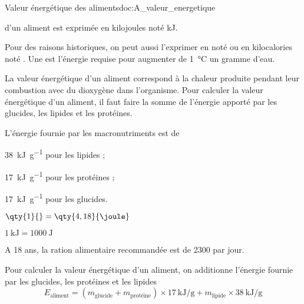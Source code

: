 \newpage
\vspace*{-36pt}
\begin{doc}{Valeur énergétique des aliments}{doc:A_valeur_energetique}
  \begin{importants}  
     d'un aliment est exprimée en kilojoules noté \unit{\kilo\joule}.
  \end{importants}
  Pour des raisons historiques, on peut aussi l'exprimer en  noté \unit{\cal} ou en kilocalories noté \unit{\kcal}.
  Une  est l'énergie requise pour augmenter de \qty{1}{\degreeCelsius} un gramme d'eau.

  La valeur énergétique d'un aliment correspond à la chaleur produite pendant leur combustion avec du dioxygène dans l'organisme.
  Pour calculer la valeur énergétique d'un aliment, il faut faire la somme de l'énergie apporté par les glucides, les lipides et les protéines.
  
  \begin{importants}
    L'énergie fournie par les macronutriments est de
    \begin{listePoints}[2]
      \item \qty{38}{\kilo\joule\per\g} pour les lipides ;
      \item \qty{17}{\kilo\joule\per\g} pour les protéines ;
      \item \qty{17}{\kilo\joule\per\g} pour les glucides.
    \end{listePoints}
  \end{importants}

  \begin{donnees}[2]
    \item $\qty{1}{\cal} = \qty{4,18}{\joule}$
    \item $\qty{1}{\kilo\joule} = \qty{1000}{\joule}$
    \item A 18 ans, la ration alimentaire recommandée est de \qty{2300}{\kcal} par jour.
  \end{donnees}
  \vspace*{-12pt}
  Pour calculer la valeur énergétique d'un aliment, on additionne l'énergie fournie par les glucides, les protéines et les lipides
  \begin{equation*}
    E_\text{aliment} 
    = (m_\text{glucide} + m_\text{protéine}) \times \qty{17}{\kilo\joule\per\g}
    +  m_\text{lipide} \times \qty{38}{\kilo\joule\per\g}
  \end{equation*}
\end{doc}

